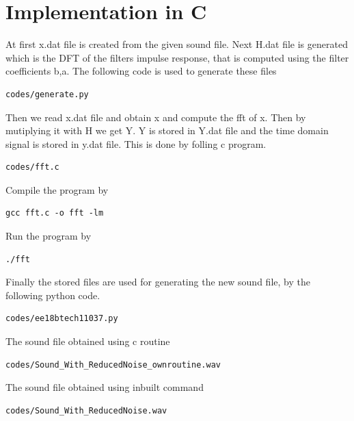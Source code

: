 \documentclass[journal,12pt,twocolumn]{IEEEtran}
\begin{document}
\section{Implementation in C}
At first x.dat file is created from the given sound file. Next H.dat file is generated which is the DFT of the filters impulse response, that is computed using the filter coefficients b,a. The following code is used to generate these files
\begin{lstlisting}
codes/generate.py
\end{lstlisting}
Then we read x.dat file and obtain x and compute the fft of x. Then by mutiplying it with H we get Y. Y is stored in Y.dat file and the time domain signal is stored in y.dat file.
This is done by folling c program.
\begin{lstlisting}
codes/fft.c
\end{lstlisting}
Compile the program by
\begin{lstlisting}
gcc fft.c -o fft -lm
\end{lstlisting}
Run the program by
\begin{lstlisting}
./fft
\end{lstlisting}
Finally the stored files are used for generating the new sound file, by the following python code.
\begin{lstlisting}
codes/ee18btech11037.py
\end{lstlisting}
The sound file obtained using c routine
\begin{lstlisting}
codes/Sound_With_ReducedNoise_ownroutine.wav
\end{lstlisting}
The sound file obtained using inbuilt command
\begin{lstlisting}
codes/Sound_With_ReducedNoise.wav
\end{lstlisting}
\end{document}
